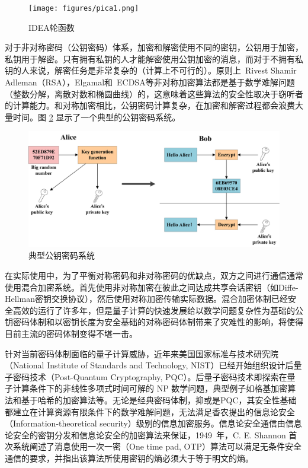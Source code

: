 \begin{figure}[h]
	\centering
	\texttt{[image: figures/pica1.png]}
	\caption{IDEA轮函数}
	\label{pica1}
\end{figure}

对于非对称密码（公钥密码）体系，加密和解密使用不同的密钥，公钥用于加密，私钥用于解密\cite{diffie1976new}。只有拥有私钥的人才能解密使用公钥加密的消息，而对于不拥有私钥的人来说，解密任务是非常复杂的（计算上不可行的）。原则上~Rivest Shamir Adleman（RSA）\cite{rivest1978method}，Elgamal\cite{elgamal1985public}和~ECDSA\cite{johnson2001elliptic}等非对称加密算法都是基于数学难解问题（整数分解，离散对数和椭圆曲线）的，这意味着这些算法的安全性取决于窃听者的计算能力。和对称加密相比，公钥密码计算复杂，在加密和解密过程都会浪费大量时间。图 \ref{pica2} 显示了一个典型的公钥密码系统。

\begin{figure}[h]
	\centering
	\includegraphics[width=13cm]{figures/pica2.png}
	\caption{典型公钥密码系统}
	\label{pica2}
\end{figure}

在实际使用中，为了平衡对称密码和非对称密码的优缺点，双方之间进行通信通常使用混合加密系统\cite{menezes2018handbook}。首先使用非对称加密在彼此之间达成共享会话密钥（如Diffe-Hellman密钥交换协议），然后使用对称加密传输实际数据。混合加密体制已经安全高效的运行了许多年，但是量子计算的快速发展给以数学问题复杂性为基础的公钥密码体制和以密钥长度为安全基础的对称密码体制带来了灾难性的影响，将使得目前主流的密码体制变得不堪一击\cite{steane1998quantum}。

针对当前密码体制面临的量子计算威胁，近年来美国国家标准与技术研究院（National Institute of Standards and Technology, NIST）已经开始组织设计后量子密码技术（Post-Quantum Cryptography, PQC）\cite{bernstein2009introduction}。后量子密码技术即探索在量子计算条件下的非线性多项式时间可解的 NP 数学问题，典型例子如格基加密算法和基于哈希的加密算法等。无论是经典密码体制，抑或是PQC，其安全性基础都建立在计算资源有限条件下的数学难解问题，无法满足香农提出的信息论安全（Information-theoretical security）级别的信息加密服务。信息论安全通信由信息论安全的密钥分发和信息论安全的加密算法来保证，1949~年，C. E. Shannon 首次系统阐述了消息使用一次一密（One time pad, OTP）算法可以满足无条件安全通信的要求，并指出该算法所使用密钥的熵必须大于等于明文的熵\cite{shannon1949communication}。

